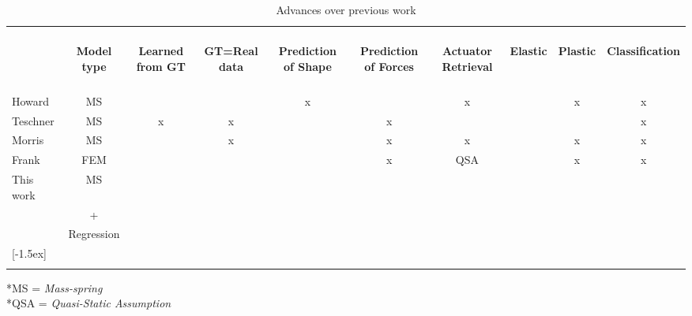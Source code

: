 \documentclass[journal]{IEEEtran}
\def\gtick{\checkmark}
\def\rcross{x}
\begin{document}
\begin{table}[htp]
  \caption{Advances over previous work}\label{t:advances}
  \begin{tabular}{lccccccccc}
  \hline \\ [-1.5ex]
 & \begin{sideways}\textbf{Model type}\end{sideways} & \begin{sideways}\textbf{Learned from GT}\end{sideways} & \begin{sideways}\textbf{GT=Real data}\end{sideways} & \begin{sideways}\textbf{Prediction of Shape} \end{sideways} & \begin{sideways}\textbf{Prediction of Forces}\end{sideways} & \begin{sideways}\textbf{Actuator Retrieval} \end{sideways} & \begin{sideways}\textbf{Elastic}\end{sideways} & \begin{sideways}\textbf{Plastic}\end{sideways} & \begin{sideways}\textbf{Classification}\end{sideways} \\
 \hline\hline \\ [-1.5ex]
  Howard & MS & \gtick  & \gtick  & \rcross & \gtick & \rcross & \gtick & \rcross & \rcross\\
Teschner & MS & \rcross & \rcross & \gtick & \rcross & \gtick & \gtick & \gtick & \rcross \\
  Morris & MS & \gtick  & \rcross & \gtick & \rcross & \rcross & \gtick & \rcross & \rcross \\
  Frank & FEM & \gtick  & \gtick & \gtick & \rcross & QSA & \gtick & \rcross & \rcross \\
  This work & MS & \gtick  & \gtick & \gtick & \gtick & \gtick & \gtick & \gtick & \gtick \\
         & + &&&&&&&&\\
         & Regression &&&&&&&& \\
 [-1.5ex] \\ \hline \\ [-1.5ex]
 \end{tabular}
 *MS = \textit{Mass-spring}\\
 *QSA = \textit{Quasi-Static Assumption}
\end{table}
\end{document}
